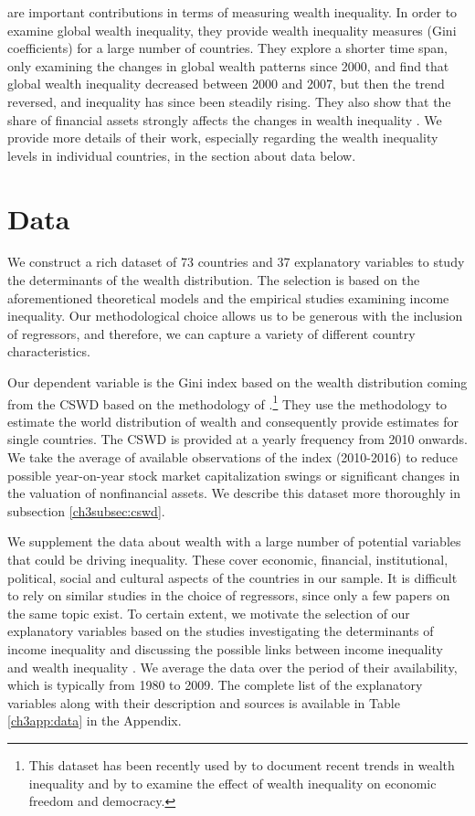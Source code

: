 \begin{refsection}
\textcite{daviesetal2017,daviesetal2011,davies2000distribution} are important contributions in terms of measuring wealth inequality. In order to examine global wealth inequality, they provide wealth inequality measures (Gini coefficients) for a large number of countries. They explore a shorter time span, only examining the changes in global wealth patterns since 2000, and find that global wealth inequality decreased between 2000 and 2007, but then the trend reversed, and inequality has since been steadily rising. They also show that the share of financial assets strongly affects the changes in wealth inequality \parencite{daviesetal2017}. We provide more details of their work, especially regarding the wealth inequality levels in individual countries, in the section about data below.
%
%
%
%
%
\section{Data}
\label{ch3sec:data}
We construct a rich dataset of 73 countries and 37 explanatory variables to study the determinants of the wealth distribution. The selection is based on the aforementioned theoretical models and the empirical studies examining income inequality. Our methodological choice allows us to be generous with the inclusion of regressors, and therefore, we can capture a variety of different country characteristics. 

Our dependent variable is the Gini index based on the wealth distribution coming from the \ac{CSWD} based on the methodology of \textcite{daviesetal2011,daviesetal2017}.\footnote{This dataset has been recently used by \textcite{anand} to document recent trends in wealth inequality and by \textcite{islam} to examine the effect of wealth inequality on economic freedom and democracy.} They use the methodology to estimate the world distribution of wealth and consequently provide estimates for single countries. The \ac{CSWD} is provided at a yearly frequency from 2010 onwards. We take the average of available observations of the index (2010-2016) to reduce possible year-on-year stock market capitalization swings or significant changes in the valuation of nonfinancial assets. We describe this dataset more thoroughly in subsection \ref{ch3subsec:cswd}.

We supplement the data about wealth with a large number of potential variables that could be driving inequality. These cover economic, financial, institutional, political, social and cultural aspects of the countries in our sample. It is difficult to rely on similar studies in the choice of regressors, since only a few papers on the same topic exist. To certain extent, we motivate the selection of our explanatory variables based on the studies investigating the determinants of income inequality and discussing the possible links between income inequality and wealth inequality \parencite{roine2015long,de2017finance}. We average the data over the period of their availability, which is typically from 1980 to 2009. The complete list of the explanatory variables along with their description and sources is available in Table \ref{ch3app:data} in the Appendix.


\end{refsection}
